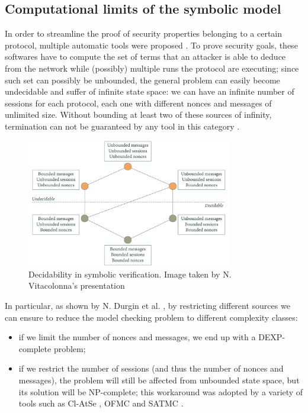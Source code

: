 \documentclass[fleqn,10pt]{SelfArx} %
\begin{document}
\subsection{Computational limits of the symbolic model}

In order to streamline the proof of security properties belonging to a certain protocol, multiple automatic tools were proposed \cite{SoK}. To prove security goals, these softwares have to compute the set of terms that an attacker is able to deduce from the network while (possibly) multiple runs the protocol are executing; since such set can possibly be unbounded, the general problem can easily become undecidable and suffer of infinite state space: we can have an infinite number of sessions for each protocol, each one with different nonces and messages of unlimited size. Without bounding at least two of these sources of infinity, termination can not be guaranteed by any tool in this category \cite{undecidability}.

\begin{figure}[t]
    \centering
    \captionsetup{justification=centering, margin=1cm}
    \includegraphics[width=0.8\textwidth]{Figures/undecidability.png}
    \caption{Decidability in symbolic verification. Image taken by N. Vitacolonna's presentation \cite{PresentazioneVitacolonna}}
\end{figure}

In particular, as shown by N. Durgin et al. \cite{ComplexityOfBoundedSecurity}, by restricting different sources we can ensure to reduce the model checking problem to different complexity classes:

\begin{itemize}
    \item if we limit the number of nonces and messages, we end up with a DEXP-complete problem;
    \item if we restrict the number of sessions (and thus the number of nonces and messages), the problem will still be affected from unbounded state space, but its solution will be NP-complete; this workaround was adopted by a variety of tools such as Cl-AtSe \cite{clAtse}, OFMC \cite{ofmc} and SATMC \cite{satmc}.
\end{itemize}
\end{document}
